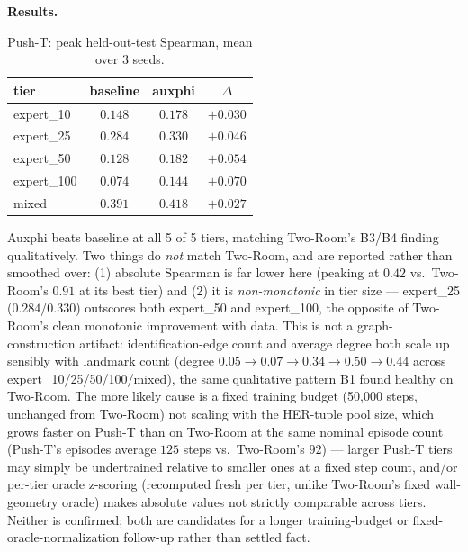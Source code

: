 \documentclass[11pt]{article}
\begin{document}
\textbf{Results.}

\begin{table}[h]
\centering
\small
\caption{Push-T: peak held-out-test Spearman, mean over 3 seeds.}
\begin{tabular}{lccc}
\toprule
tier & baseline & \textbf{auxphi} & $\Delta$ \\
\midrule
expert\_10  & $0.148$ & $\mathbf{0.178}$ & $+0.030$ \\
expert\_25  & $0.284$ & $\mathbf{0.330}$ & $+0.046$ \\
expert\_50  & $0.128$ & $\mathbf{0.182}$ & $+0.054$ \\
expert\_100 & $0.074$ & $\mathbf{0.144}$ & $+0.070$ \\
mixed       & $0.391$ & $\mathbf{0.418}$ & $+0.027$ \\
\bottomrule
\end{tabular}
\end{table}

Auxphi beats baseline at all 5 of 5 tiers, matching Two-Room's B3/B4 finding qualitatively. Two
things do \emph{not} match Two-Room, and are reported rather than smoothed over: (1) absolute
Spearman is far lower here (peaking at $0.42$ vs.\ Two-Room's $0.91$ at its best tier) and (2) it
is \emph{non-monotonic} in tier size --- expert\_25 ($0.284$/$0.330$) outscores both expert\_50
and expert\_100, the opposite of Two-Room's clean monotonic improvement with data. This is not a
graph-construction artifact: identification-edge count and average degree both scale up sensibly
with landmark count (degree $0.05\to0.07\to0.34\to0.50\to0.44$ across
expert\_10/25/50/100/mixed), the same qualitative pattern B1 found healthy on Two-Room. The more
likely cause is a fixed training budget (50{,}000 steps, unchanged from Two-Room) not scaling
with the HER-tuple pool size, which grows faster on Push-T than on Two-Room at the same nominal
episode count (Push-T's episodes average $125$ steps vs.\ Two-Room's $92$) --- larger Push-T
tiers may simply be undertrained relative to smaller ones at a fixed step count, and/or per-tier
oracle z-scoring (recomputed fresh per tier, unlike Two-Room's fixed wall-geometry oracle) makes
absolute values not strictly comparable across tiers. Neither is confirmed; both are candidates
for a longer training-budget or fixed-oracle-normalization follow-up rather than settled fact.
\end{document}
